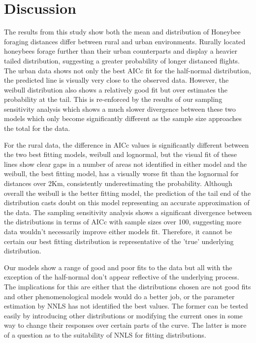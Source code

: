 \documentclass[11pt]{article}
\begin{document}
\section{Discussion}	
\begin{linenumbers}
\par
The results from this study show both the mean and distribution of Honeybee foraging distances differ between rural and urban environments. Rurally located honeybees forage further than their urban counterparts and display a heavier tailed distribution, suggesting a greater probability of longer distanced flights. The urban data shows not only the best AICc fit for the half-normal distribution, the predicted line is visually very close to the observed data. However, the weibull distribution also shows a relatively good fit but over estimates the probability at the tail. This is re-enforced by the results of our sampling sensitivity analysis which shows a much slower divergence between these two models which only become significantly different as the sample size approaches the total for the data.\par

For the rural data, the difference in AICc values is significantly different between the two best fitting models, weibull and lognormal, but the visual fit of these lines show clear gaps in a number of areas not identified in either model and the weibull, the best fitting model, has a visually worse fit than the lognormal for distances over 2Km, consistently underestimating the probability. Although overall the weibull is the better fitting model, the prediction of the tail end of the distribution casts doubt on this model representing an accurate approximation of the data. The sampling sensitivity analysis shows a significant divergence between the distributions in terms of AICc with sample sizes over 100, suggesting more data wouldn't necessarily improve either models fit. Therefore, it cannot be certain our best fitting distribution is representative of the 'true' underlying distribution.\par

Our models show a range of good and poor fits to the data but all with the exception of the half-normal don't appear reflective of the underlying process. The implications for this are either that the distributions chosen are not good fits and other phenomenological models would do a better job, or the parameter estimation by NNLS has not identified the best values. The former can be tested easily by introducing other distributions or modifying the current ones in some way to change their responses over certain parts of the curve. The latter is more of a question as to the suitability of NNLS for fitting distributions.\par


\end{linenumbers}
\end{document}
